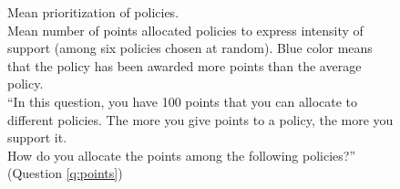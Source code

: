 \begin{figure}[h!] 
    \caption[Mean prioritization of policies]{Mean prioritization of policies. \\Mean number of points allocated policies to express intensity of support (among six policies chosen at random). Blue color means that the policy has been awarded more points than the average policy. \\ ``In this question, you have 100 points that you can allocate to different policies. The more you give points to a policy, the more you support it. \\ How do you allocate the points among the following policies?'' (Question \ref{q:points})}\label{fig:points}
\end{figure}

